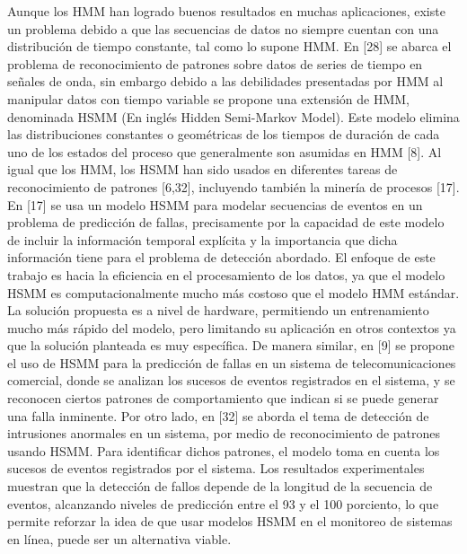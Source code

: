 Aunque los HMM han logrado buenos resultados en muchas aplicaciones, existe un problema debido a que las secuencias de datos no siempre cuentan con una distribución de tiempo constante, tal como lo supone HMM. En [28] se abarca el problema de reconocimiento de patrones sobre datos de series de tiempo en señales de onda, sin embargo debido a las debilidades presentadas por HMM al manipular datos con tiempo variable se propone una extensión de HMM, denominada HSMM (En inglés Hidden Semi-Markov Model). Este modelo elimina las distribuciones constantes o geométricas de los tiempos de duración de cada uno de los estados del proceso que generalmente son asumidas en HMM [8]. Al igual que los HMM, los HSMM han sido usados en diferentes tareas de reconocimiento de patrones [6,32], incluyendo también la minería de procesos [17]. En [17] se usa un modelo HSMM para modelar secuencias de eventos en un problema de predicción de fallas, precisamente por la capacidad de este modelo de incluir la información temporal explícita y la importancia que dicha información tiene para el problema de detección abordado. El enfoque de este trabajo es hacia la eficiencia en el procesamiento de los datos, ya que el modelo HSMM es computacionalmente mucho más costoso que el modelo HMM estándar. La solución propuesta es a nivel de hardware, permitiendo un entrenamiento mucho más rápido del modelo, pero limitando su aplicación en otros contextos ya que la solución planteada es muy específica. De manera similar, en [9] se propone el uso de HSMM para la predicción de fallas en un sistema de telecomunicaciones comercial, donde se analizan los sucesos de eventos registrados en el sistema, y se reconocen ciertos patrones de comportamiento que indican si se puede generar una falla inminente. Por otro lado, en [32] se aborda el tema de detección de intrusiones anormales en un sistema, por medio de reconocimiento de patrones usando HSMM. Para identificar dichos patrones, el modelo toma en cuenta los sucesos de eventos registrados por el sistema. Los resultados experimentales muestran que la detección de fallos depende de la longitud de la secuencia de eventos, alcanzando niveles de predicción entre el 93 y el 100 porciento, lo que permite reforzar la idea de que usar modelos HSMM en el monitoreo de sistemas en línea, puede ser un alternativa viable.

